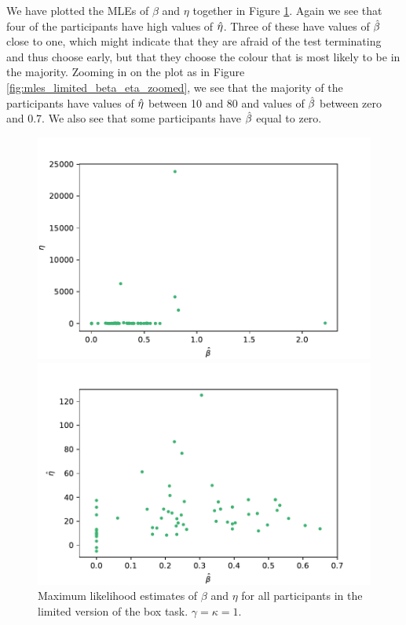 We have plotted the MLEs of $\beta$ and $\eta$ together in Figure \ref{fig:mles_limited_beta_eta}. Again we see that four of the participants have high values of $\hat{\eta}$. Three of these have values of $\hat{\beta}$ close to one, which might indicate that they are afraid of the test terminating and thus choose early, but that they choose the colour that is most likely to be in the majority. Zooming in on the plot as in Figure \ref{fig:mles_limited_beta_eta_zoomed}, we see that the majority of the participants have values of $\hat{\eta}$ between 10 and 80 and values of $\hat{\beta}$ between zero and 0.7. We also see that some participants have $\hat{\beta}$ equal to zero. 
\begin{figure}
    \centering
    \begin{minipage}{0.48\textwidth}
        \centering
        \includegraphics[scale=0.36]{pictures/plotted_mles_limited_beta_eta_gk1.pdf}
        \caption[MLEs of $\beta$ and $\eta$, limited. $\gamma=\kappa=1$]{Maximum likelihood estimates of $\beta$ and $\eta$ for all participants in the limited version of the box task. $\gamma=\kappa=1$.}
        \label{fig:mles_limited_beta_eta}
    \end{minipage}
    \hfill
    \begin{minipage}{0.48\textwidth}
        \centering
        \includegraphics[scale=0.36]{pictures/plotted_mles_limited_beta_eta_zoomed_gk1.pdf}

\end{minipage}
\end{figure}
